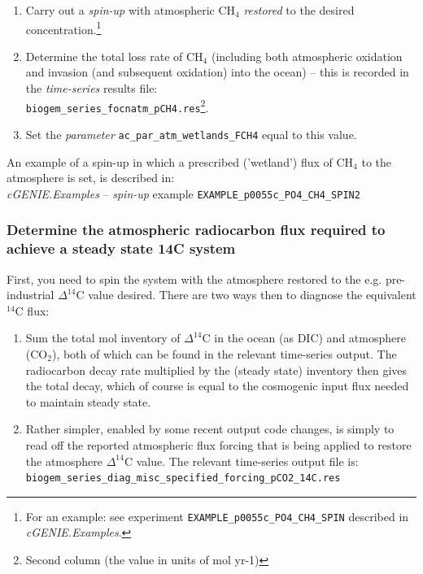 \documentclass[11pt,fleqn]{book} %
\begin{document}
\begin{enumerate}[noitemsep]

\vspace{1mm}
        \item Carry out a \textit{spin-up} with atmospheric CH\(_{4}\) \textit{restored} to the desired concentration.\footnote{For an example: see experiment \texttt{EXAMPLE\_p0055c\_PO4\_CH4\_SPIN} described in \textit{cGENIE.Examples}.}

\vspace{1mm}
        \item Determine the total loss rate of CH\(_{4}\) (including both atmospheric oxidation and invasion (and subsequent oxidation) into the ocean) -- this is recorded in the \textit{time-series} results file:\\ \texttt{biogem\_series\_focnatm\_pCH4.res}\footnote{Second column (the value in units of mol yr-1)}.

\vspace{1mm}
        \item Set the \textit{parameter} \texttt{ac\_par\_atm\_wetlands\_FCH4} equal to this value.
\end{enumerate} 

An example of a spin-up in which a prescribed ('wetland') flux of CH\(_{4}\) to the atmosphere is set, is described in:\\ \textit{cGENIE.Examples} -- \textit{spin-up} example \texttt{EXAMPLE\_p0055c\_PO4\_CH4\_SPIN2}

%
\subsubsection{Determine the atmospheric radiocarbon flux required to achieve a steady state 14C system}
\vspace{1mm}

First, you need to spin the system with the atmosphere restored to the e.g. pre-industrial \(\Delta^{14}\)C value desired. There are two ways then to diagnose the equivalent \(^{14}\)C flux:

\begin{enumerate}[noitemsep]

\vspace{1mm}
\item Sum the total mol inventory of \(\Delta^{14}\)C in the ocean (as DIC) and atmosphere (CO\(_{2}\)), both of which can be found in the relevant time-series output. The radiocarbon decay rate multiplied by the (steady state) inventory then gives the total decay, which of course is equal to the cosmogenic input flux needed to maintain steady state.

\vspace{1mm}
\item Rather simpler, enabled by some recent output code changes, is simply to read off the reported atmospheric flux forcing that is being applied to restore the atmosphere \(\Delta^{14}\)C value. The relevant time-series output file is:
\\\texttt{biogem\_series\_diag\_misc\_specified\_forcing\_pCO2\_14C.res}

\end{enumerate}
\end{document}
